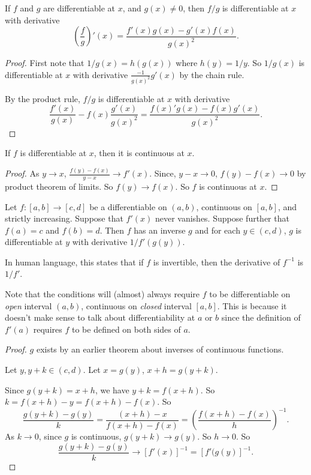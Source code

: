 \documentclass[a4paper]{article}
\begin{document}
\begin{lemma}
  If $f$ and $g$ are differentiable at $x$, and $g(x) \not = 0$, then $f/g$ is differentiable at $x$ with derivative
  \[
    \left(\frac{f}{g}\right)'(x) = \frac{f'(x)g(x) - g'(x)f(x)}{g(x)^2}.
  \]
\end{lemma}

\begin{proof}
  First note that $1/g(x) = h(g(x))$ where $h(y) = 1/y$. So $1/g(x)$ is differentiable at $x$ with derivative $\displaystyle \frac{-1}{g(x)^2}g'(x)$ by the chain rule.

  By the product rule, $f/g$ is differentiable at $x$ with derivative
  \[
    \frac{f'(x)}{g(x)} - f(x)\frac{g'(x)}{g(x)^2} = \frac{f(x)'g(x) - f(x)g'(x)}{g(x)^2}.
  \]
\end{proof}
\begin{lemma}
  If $f$ is differentiable at $x$, then it is continuous at $x$.
\end{lemma}

\begin{proof}
  As $y\to x$, $\displaystyle \frac{f(y) - f(x)}{y - x} \to f'(x)$. Since, $y - x \to 0$, $f(y) - f(x) \to 0$ by product theorem of limits. So $f(y) \to f(x)$. So $f$ is continuous at $x$.
\end{proof}

\begin{thm}
  Let $f:[a, b]\to [c, d]$ be a differentiable on $(a, b)$, continuous on $[a, b]$, and strictly increasing. Suppose that $f'(x)$ never vanishes. Suppose further that $f(a) = c$ and $f(b) = d$. Then $f$ has an inverse $g$ and for each $y\in (c, d)$, $g$ is differentiable at $y$ with derivative $1/f'(g(y))$.

  In human language, this states that if $f$ is invertible, then the derivative of $f^{-1}$ is $1/f'$.
\end{thm}
Note that the conditions will (almost) always require $f$ to be differentiable on \emph{open} interval $(a, b)$, continuous on \emph{closed} interval $[a, b]$. This is because it doesn't make sense to talk about differentiability at $a$ or $b$ since the definition of $f'(a)$ requires $f$ to be defined on both sides of $a$.

\begin{proof}
  $g$ exists by an earlier theorem about inverses of continuous functions.

  Let $y, y + k\in (c, d)$. Let $x = g(y)$, $x + h = g(y + k)$.

  Since $g(y + k) = x + h$, we have $y + k = f(x + h)$. So $k = f(x + h) - y = f(x + h) - f(x)$. So
  \[
    \frac{g(y + k) - g(y)}{k} = \frac{(x + h) - x}{f(x + h) - f(x)} = \left(\frac{f(x + h) - f(x)}{h}\right)^{-1}.
  \]
  As $k \to 0$, since $g$ is continuous, $g(y + k) \to g(y)$. So $h \to 0$. So
  \[
    \frac{g(y + k) - g(y)}{k} \to [f'(x)]^{-1} = [f'(g(y)]^{-1}.
  \]
\end{proof}
\end{document}
